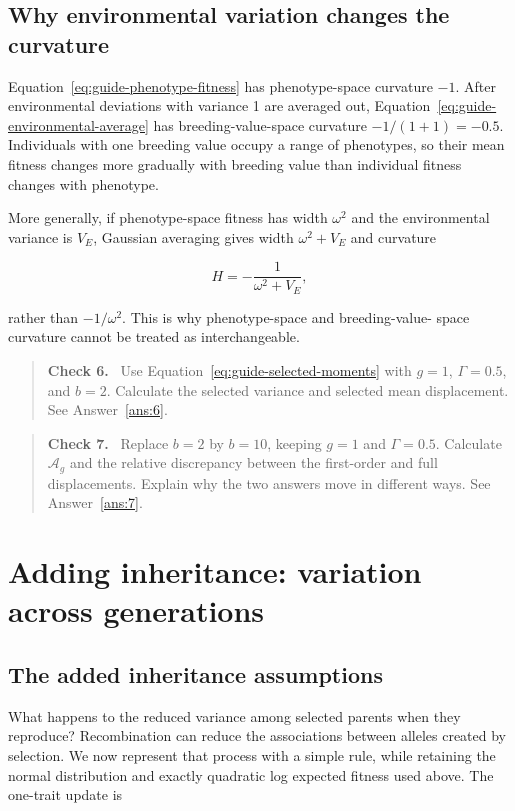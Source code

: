 \documentclass[11pt]{article}
\newcommand{\Ag}{\ensuremath{\mathcal A_g}}
\newenvironment{checkpoint}[1]
  {\begin{quote}\small\noindent\textbf{Check #1.}\ }
  {\end{quote}}
\newcounter{answer}
\begin{document}
\subsection{Why environmental variation changes the curvature}

Equation~\eqref{eq:guide-phenotype-fitness} has phenotype-space curvature
$-1$.  After environmental deviations with variance 1 are averaged out,
Equation~\eqref{eq:guide-environmental-average} has breeding-value-space
curvature $-1/(1+1)=-0.5$.  Individuals with one breeding value occupy a range
of phenotypes, so their mean fitness changes more gradually with breeding
value than individual fitness changes with phenotype.

More generally, if phenotype-space fitness has width $\omega^2$ and the
environmental variance is $V_E$, Gaussian averaging gives width
$\omega^2+V_E$ and curvature

\begin{equation}
H=-\frac{1}{\omega^2+V_E},
\end{equation}

rather than $-1/\omega^2$.  This is why phenotype-space and breeding-value-
space curvature cannot be treated as interchangeable.

\begin{checkpoint}{6}
Use Equation~\eqref{eq:guide-selected-moments} with $g=1$, $\Gamma=0.5$, and
$b=2$.  Calculate the selected variance and selected mean displacement.  See
Answer~\ref{ans:6}.
\end{checkpoint}

\begin{checkpoint}{7}
Replace $b=2$ by $b=10$, keeping $g=1$ and $\Gamma=0.5$.  Calculate \Ag{} and
the relative discrepancy between the first-order and full displacements.
Explain why the two answers move in different ways.  See
Answer~\ref{ans:7}.
\end{checkpoint}

\section{Adding inheritance: variation across generations}
\label{sec:s3}

\subsection{The added inheritance assumptions}

What happens to the reduced variance among selected parents when they reproduce? Recombination can reduce the associations between alleles created by selection. We now represent that process with a simple rule, while retaining the normal distribution and exactly quadratic log expected fitness used above. The one-trait update is
\end{document}

